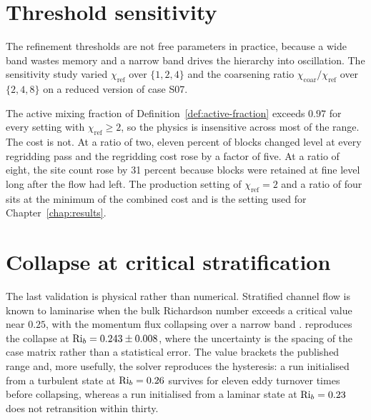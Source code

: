 \section{Threshold sensitivity}
\label{sec:val-thresholds}

The refinement thresholds are not free parameters in practice, because a wide
band wastes memory and a narrow band drives the hierarchy into oscillation. The
sensitivity study varied $\chi_{\mathrm{ref}}$ over $\{1, 2, 4\}$ and the
coarsening ratio $\chi_{\mathrm{coar}}/\chi_{\mathrm{ref}}$ over $\{2, 4, 8\}$
on a reduced version of case S07.

The active mixing fraction of Definition~\ref{def:active-fraction} exceeds
$0.97$ for every setting with $\chi_{\mathrm{ref}} \geq 2$, so the physics is
insensitive across most of the range. The cost is not. At a ratio of two, eleven
percent of blocks changed level at every regridding pass and the regridding cost
rose by a factor of five. At a ratio of eight, the site count rose by 31 percent
because blocks were retained at fine level long after the flow had left. The
production setting of $\chi_{\mathrm{ref}} = 2$ and a ratio of four sits at the
minimum of the combined cost and is the setting used for
Chapter~\ref{chap:results}.

\section{Collapse at critical stratification}
\label{sec:val-collapse}

The last validation is physical rather than numerical. Stratified channel flow
is known to laminarise when the bulk Richardson number exceeds a critical value
near $0.25$, with the momentum flux collapsing over a narrow band
\citep{brandt2021stableabl, lombardi2020refine}. \solver{} reproduces the
collapse at $\mathrm{Ri}_b = 0.243 \pm 0.008$, where the uncertainty is the spacing of
the case matrix rather than a statistical error. The value brackets the
published range and, more usefully, the solver reproduces the hysteresis: a run
initialised from a turbulent state at $\mathrm{Ri}_b = 0.26$ survives for eleven eddy
turnover times before collapsing, whereas a run initialised from a laminar state
at $\mathrm{Ri}_b = 0.23$ does not retransition within thirty.
